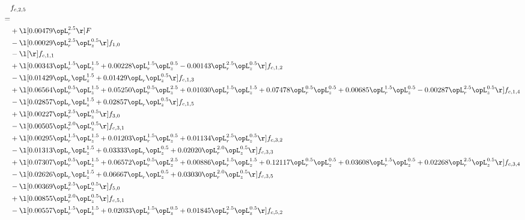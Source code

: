 \begin{alignat}{2} 
\label{eq:f_25_1} 
& f_{c,2,5} \nonumber \\ 
 = \\ 
& + \l[  0.00479 \opL_r^{2.5}  \r] F \nonumber \\ 
& - \l[  0.00029 \opL_r^{2.5} \opL_z^{0.5}  \r] f_{1,0} \nonumber \\ 
& - \l[  \r] f_{c,1,1} \nonumber \\ 
& + \l[  0.00343 \opL_r^{1.5} \opL_z^{1.5} +  0.00228 \opL_r^{1.5} \opL_z^{0.5}   -0.00143 \opL_r^{2.5} \opL_z^{0.5}  \r] f_{c,1,2} \nonumber \\ 
& - \l[  0.01429 \opL_r \opL_z^{1.5} +  0.01429 \opL_r \opL_z^{0.5}  \r] f_{c,1,3} \nonumber \\ 
& + \l[  0.06564 \opL_r^{0.5} \opL_z^{1.5} +  0.05250 \opL_r^{0.5} \opL_z^{2.5} +  0.01030 \opL_r^{1.5} \opL_z^{1.5} +  0.07478 \opL_r^{0.5} \opL_z^{0.5} +  0.00685 \opL_r^{1.5} \opL_z^{0.5}   -0.00287 \opL_r^{2.5} \opL_z^{0.5}  \r] f_{c,1,4} \nonumber \\ 
& - \l[  0.02857 \opL_r \opL_z^{1.5} +  0.02857 \opL_r \opL_z^{0.5}  \r] f_{c,1,5} \nonumber \\ 
& + \l[  0.00227 \opL_r^{2.5} \opL_z^{0.5}  \r] f_{3,0} \nonumber \\ 
& - \l[  0.00505 \opL_r^{2.0} \opL_z^{0.5}  \r] f_{c,3,1} \nonumber \\ 
& + \l[  0.00295 \opL_r^{1.5} \opL_z^{1.5} +  0.01203 \opL_r^{1.5} \opL_z^{0.5} +  0.01134 \opL_r^{2.5} \opL_z^{0.5}  \r] f_{c,3,2} \nonumber \\ 
& - \l[  0.01313 \opL_r \opL_z^{1.5} +  0.03333 \opL_r \opL_z^{0.5} +  0.02020 \opL_r^{2.0} \opL_z^{0.5}  \r] f_{c,3,3} \nonumber \\ 
& + \l[  0.07307 \opL_r^{0.5} \opL_z^{1.5} +  0.06572 \opL_r^{0.5} \opL_z^{2.5} +  0.00886 \opL_r^{1.5} \opL_z^{1.5} +  0.12117 \opL_r^{0.5} \opL_z^{0.5} +  0.03608 \opL_r^{1.5} \opL_z^{0.5} +  0.02268 \opL_r^{2.5} \opL_z^{0.5}  \r] f_{c,3,4} \nonumber \\ 
& - \l[  0.02626 \opL_r \opL_z^{1.5} +  0.06667 \opL_r \opL_z^{0.5} +  0.03030 \opL_r^{2.0} \opL_z^{0.5}  \r] f_{c,3,5} \nonumber \\ 
& - \l[  0.00369 \opL_r^{2.5} \opL_z^{0.5}  \r] f_{5,0} \nonumber \\ 
& + \l[  0.00855 \opL_r^{2.0} \opL_z^{0.5}  \r] f_{c,5,1} \nonumber \\ 
& - \l[  0.00557 \opL_r^{1.5} \opL_z^{1.5} +  0.02033 \opL_r^{1.5} \opL_z^{0.5} +  0.01845 \opL_r^{2.5} \opL_z^{0.5}  \r] f_{c,5,2} \nonumber \\ 

\end{alignat}
